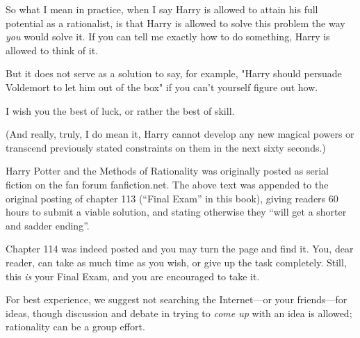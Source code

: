 {    So what I mean in practice,
    when I say Harry is allowed to attain his full potential as a
    rationalist,
    is that Harry is allowed to solve this problem
    the way \emph{you} would solve it.
    If you can tell me exactly how to do something,
    Harry is allowed to think of it.

    But it does not serve as a solution to say, for example,
    "Harry should persuade Voldemort to let him out of the box"
    if you can't yourself figure out how.


    I wish you the best of luck, or rather the best of skill.

    (And really, truly, I do mean it,
    Harry cannot develop any new magical powers
    or transcend previously stated constraints on them
    in the next sixty seconds.)

    \sbreak%

    Harry Potter and the Methods of Rationality was originally posted as serial fiction
    on the fan forum fanfiction.net. The above text was appended to the original posting
    of chapter 113 (``Final Exam'' in this book), giving readers 60 hours to submit a
    viable solution, and stating otherwise they ``will get a shorter and sadder ending''.

    Chapter 114 was indeed posted and you may turn the page and find it. You, dear reader, can
    take as much time as you wish, or give up the task completely. Still, this \emph{is}  your
    Final Exam, and you are encouraged to take it.

    For best experience, we suggest not searching the Internet---or your friends---for ideas, though
    discussion and debate in trying to \emph{come up} with an idea is allowed; rationality can be a group effort.
}


\cleartoverso%
\cleartoverso%
